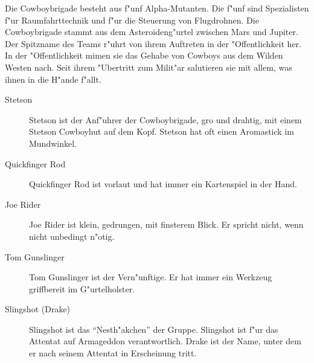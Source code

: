 
Die Cowboybrigade besteht aus f"unf Alpha-Mutanten. Die f"unf sind Spezialisten f"ur Raumfahrttechnik und f"ur die Steuerung von Flugdrohnen. Die Cowboybrigade stammt aus dem Asteroideng"urtel zwischen Mars und Jupiter. Der Spitzname des Teams r"uhrt von ihrem Auftreten in der "Offentlichkeit her. In der "Offentlichkeit mimen sie das Gehabe von Cowboys aus dem Wilden Westen nach. Seit ihrem "Ubertritt zum Milit"ar salutieren sie mit allem, was ihnen in die H"ande f"allt.

\begin{description}
    \item[Stetson] Stetson ist der Anf"uhrer der Cowboybrigade, gro\3 und drahtig, mit einem Stetson Cowboyhut auf dem Kopf. Stetson hat    
        oft einen Aromastick im Mundwinkel.
    \item[Quickfinger Rod] Quickfinger Rod ist vorlaut und hat immer ein Kartenspiel in der Hand.
    \item[Joe Rider] Joe Rider ist klein, gedrungen, mit finsterem Blick. Er spricht nicht, wenn nicht unbedingt n"otig.
    \item[Tom Gunslinger] Tom Gunslinger ist der Vern"unftige. Er hat immer ein Werkzeug griffbereit im G"urtelholster.
    \item[Slingshot (Drake)]  Slingshot ist das ``Nesth"akchen'' der Gruppe. Slingshot ist f"ur das Attentat auf Armageddon verantwortlich. 
        Drake ist der Name, unter dem er nach seinem Attentat in Erscheinung tritt.
\end{description}

\newpage
